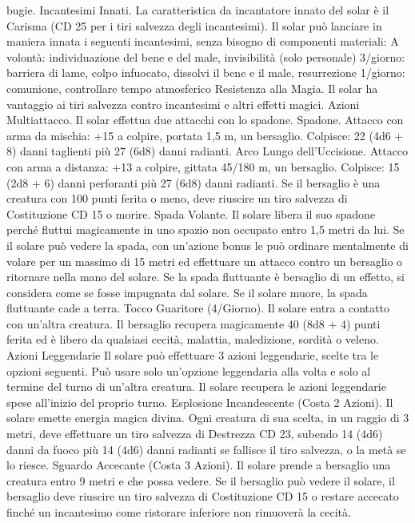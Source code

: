 \begin{multicols}{2}
bugie.
Incantesimi Innati. La caratteristica da incantatore innato del
solar è il Carisma (CD 25 per i tiri salvezza degli incantesimi). Il
solar può lanciare in maniera innata i seguenti incantesimi, senza
bisogno di componenti materiali:
A volontà: individuazione del bene e del male, invisibilità (solo
personale)
3/giorno: barriera di lame, colpo infuocato, dissolvi il bene e il
male, resurrezione
1/giorno: comunione, controllare tempo atmosferico
Resistenza alla Magia. Il solar ha vantaggio ai tiri salvezza
contro incantesimi e altri effetti magici.
Azioni
Multiattacco. Il solar effettua due attacchi con lo spadone.
Spadone. Attacco con arma da mischia: +15 a colpire, portata
1,5 m, un bersaglio.
Colpisce: 22 (4d6 + 8) danni taglienti più 27 (6d8) danni radianti.
Arco Lungo dell’Uccisione. Attacco con arma a distanza: +13 a
colpire, gittata 45/180 m, un bersaglio.
Colpisce: 15 (2d8 + 6) danni perforanti più 27 (6d8) danni radianti.
Se il bersaglio è una creatura con 100 punti ferita o meno, deve
riuscire un tiro salvezza di Costituzione CD 15 o morire.
Spada Volante. Il solare libera il suo spadone perché fluttui
magicamente in uno spazio non occupato entro 1,5 metri da lui.
Se il solare può vedere la spada, con un’azione bonus le può
ordinare mentalmente di volare per un massimo di 15 metri ed
effettuare un attacco contro un bersaglio o ritornare nella mano
del solare. Se la spada fluttuante è bersaglio di un effetto, si
considera come se fosse impugnata dal solare. Se il solare muore,
la spada fluttuante cade a terra.
Tocco Guaritore (4/Giorno). Il solare entra a contatto con
un’altra creatura. Il bersaglio recupera magicamente 40 (8d8 + 4)
punti ferita ed è libero da qualsiasi cecità, malattia, maledizione,
sordità o veleno.
Azioni Leggendarie
Il solare può effettuare 3 azioni leggendarie, scelte tra le opzioni
seguenti. Può usare solo un’opzione leggendaria alla volta e solo
al termine del turno di un’altra creatura. Il solare recupera le
azioni leggendarie spese all’inizio del proprio turno.
Esplosione Incandescente (Costa 2 Azioni). Il solare emette
energia magica divina. Ogni creatura di sua scelta, in un raggio di 3
metri, deve effettuare un tiro salvezza di Destrezza CD 23, subendo
14 (4d6) danni da fuoco più 14 (4d6) danni radianti se fallisce il tiro
salvezza, o la metà se lo riesce.
Sguardo Accecante (Costa 3 Azioni). Il solare prende a
bersaglio una creatura entro 9 metri e che possa vedere. Se il
bersaglio può vedere il solare, il bersaglio deve riuscire un tiro
salvezza di Costituzione CD 15 o restare accecato finché un
incantesimo come ristorare inferiore non rimuoverà la cecità.

\end{multicols}
